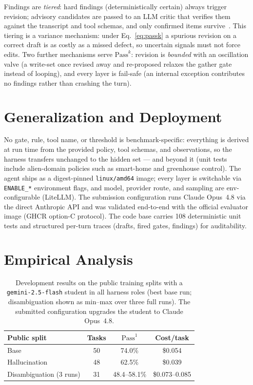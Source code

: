 \documentclass{article}
\newcommand{\pass}[1]{\ensuremath{\mathrm{Pass}^{#1}}}
\begin{document}
Findings are \emph{tiered}: hard findings (deterministically certain) always
trigger revision; advisory candidates are passed to an LLM critic that
verifies them against the transcript and tool schemas, and only confirmed
items survive~\cite{dhuliawala2023cove}. This tiering is a variance mechanism:
under Eq.~\eqref{eq:passk} a spurious revision on a correct draft is as costly
as a missed defect, so uncertain signals must not force edits. Two further
mechanisms serve $\pass{k}$: revision is \emph{bounded} with an oscillation
valve (a write-set once revised away and re-proposed relaxes the gather gate
instead of looping), and every layer is fail-safe (an internal exception
contributes no findings rather than crashing the turn).

\section{Generalization and Deployment}
No gate, rule, tool name, or threshold is benchmark-specific: everything is
derived at run time from the provided policy, tool schemas, and observations,
so the harness transfers unchanged to the hidden set --- and beyond it (unit
tests include alien-domain policies such as smart-home and greenhouse
control). The agent ships as a digest-pinned \texttt{linux/amd64} image; every
layer is switchable via \texttt{ENABLE\_*} environment flags, and model,
provider route, and sampling are env-configurable (LiteLLM). The submission
configuration runs Claude Opus~4.8 via the direct Anthropic API and was
validated end-to-end with the official evaluator image (GHCR option-C
protocol). The code base carries 108 deterministic unit tests and structured
per-turn traces (drafts, fired gates, findings) for auditability.

\section{Empirical Analysis}
\label{sec:eval}
\begin{table}[t]
\centering
\scriptsize
\begin{tabular}{lccc}
\toprule
Public split & Tasks & $\pass{1}$ & Cost/task \\
\midrule
Base & 50 & 74.0\% & \$0.054 \\
Hallucination & 48 & 62.5\% & \$0.039 \\
Disambiguation (3 runs) & 31 & 48.4--58.1\% & \$0.073--0.085 \\
\bottomrule
\end{tabular}
\caption{Development results on the public training splits with a
\texttt{gemini-2.5-flash} student in all harness roles (best base run;
disambiguation shown as min--max over three full runs). The submitted
configuration upgrades the student to Claude Opus~4.8.}
\label{tab:results}
\end{table}
\end{document}
